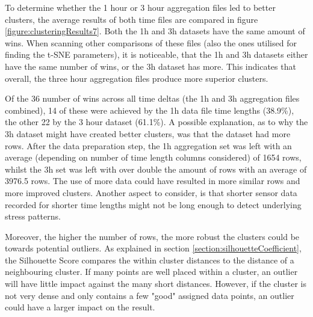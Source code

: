 To determine whether the 1 hour or 3 hour aggregation files led to better clusters, the average results of both time files are compared in figure \ref{figure:clusteringResults7}. Both the 1h and 3h datasets have the same amount of wins. When scanning other comparisons of these files (also the ones utilised for finding the t-SNE parameters), it is noticeable, that the 1h and 3h datasets either have the same number of wins, or the 3h dataset has more. This indicates that overall, the three hour aggregation files produce more superior clusters.

Of the 36 number of wins across all time deltas (the 1h and 3h aggregation files combined), 14 of these were achieved by the 1h data file time lengths (38.9\%), the other 22 by the 3 hour dataset (61.1\%). A possible explanation, as to why the 3h dataset might have created better clusters, was that the dataset had more rows. After the data preparation step, the 1h aggregation set was left with an average (depending on number of time length columns considered) of 1654 rows, whilst the 3h set was left with over double the amount of rows with an average of 3976.5 rows. The use of more data could have resulted in more similar rows and more improved clusters. Another aspect to consider, is that shorter sensor data recorded for shorter time lengths might not be long enough to detect underlying stress patterns.

Moreover, the higher the number of rows, the more robust the clusters could be towards potential outliers. As explained in section \ref{section:silhouetteCoefficient}, the Silhouette Score compares the within cluster distances to the distance of a neighbouring cluster. If many points are well placed within a cluster, an outlier will have little impact against the many short distances. However, if the cluster is not very dense and only contains a few "good" assigned data points, an outlier could have a larger impact on the result.

